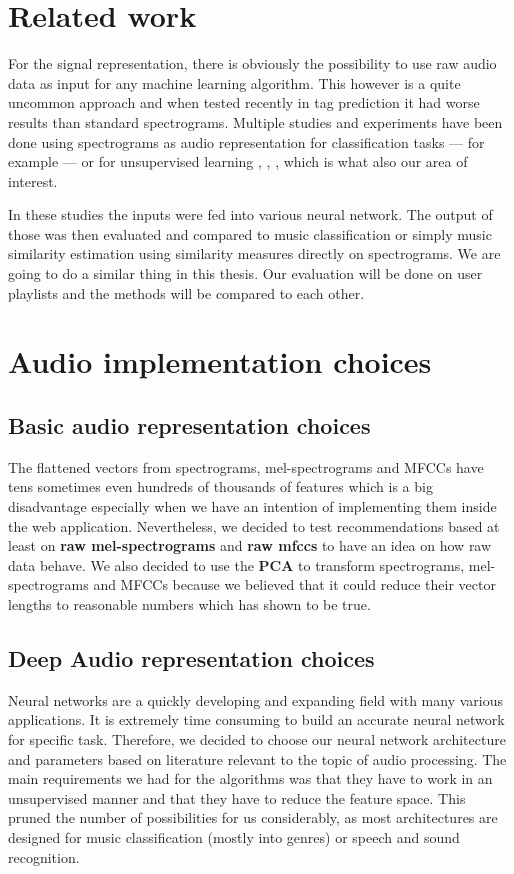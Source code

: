 \section{Related work}\label{sec:audio_related_work}
For the signal representation, there is obviously the possibility to use raw audio data as input for any machine learning algorithm. This however is a quite uncommon approach and when tested recently in tag prediction \cite{6854950} it had worse results than standard spectrograms. Multiple studies and experiments have been done using spectrograms as audio representation for classification tasks --- for example \cite{wang2014improving} --- or for unsupervised learning \cite{van2013deep}, \cite{Ramakrishnan2017song2V}, \cite{NIPS2009_3674}, which is what also our area of interest. 

In these studies the inputs were fed into various neural network. The output of those was then evaluated and compared to music classification or simply music similarity estimation using similarity measures directly on spectrograms. We are going to do a similar thing in this thesis. Our evaluation will be done on user playlists and the methods will be compared to each other.

\section{Audio implementation choices}

\subsection{Basic audio representation choices}
The flattened vectors from spectrograms, mel-spectrograms and MFCCs have tens sometimes even hundreds of thousands of features which is a big disadvantage especially when we have an intention of implementing them inside the web application. Nevertheless, we decided to test recommendations based at least on \textbf{raw mel-spectrograms} and \textbf{raw mfccs} to have an idea on how raw data behave. We also decided to use the \textbf{PCA} to transform spectrograms, mel-spectrograms and MFCCs because we believed that it could reduce their vector lengths to reasonable numbers which has shown to be true.


\subsection{Deep Audio representation choices}
Neural networks are a quickly developing and expanding field with many various applications. It is extremely time consuming to build an accurate neural network for specific task. Therefore, we decided to choose our neural network architecture and parameters based on literature relevant to the topic of audio processing. The main requirements we had for the algorithms was that they have to work in an unsupervised manner and that they have to reduce the feature space. This pruned the number of possibilities for us considerably, as most architectures are designed for music classification (mostly into genres) or speech and sound recognition. 

